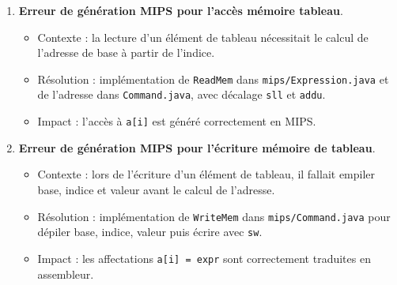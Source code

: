 \documentclass[a4paper,11pt]{article}
\begin{document}
\begin{enumerate}[label=\arabic*)]
  \item \textbf{Erreur de génération MIPS pour l'accès mémoire tableau}.
  \begin{itemize}
    \item Contexte : la lecture d'un élément de tableau nécessitait le calcul de l'adresse de base à partir de l'indice.
    \item Résolution : implémentation de \texttt{ReadMem} dans \texttt{mips/Expression.java} et de l'adresse dans \texttt{Command.java}, avec décalage \texttt{sll} et \texttt{addu}.
    \item Impact : l'accès à \texttt{a[i]} est généré correctement en MIPS.
  \end{itemize}

  \item \textbf{Erreur de génération MIPS pour l'écriture mémoire de tableau}.
  \begin{itemize}
    \item Contexte : lors de l'écriture d'un élément de tableau, il fallait empiler base, indice et valeur avant le calcul de l'adresse.
    \item Résolution : implémentation de \texttt{WriteMem} dans \texttt{mips/Command.java} pour dépiler base, indice, valeur puis écrire avec \texttt{sw}.
    \item Impact : les affectations \texttt{a[i] = expr} sont correctement traduites en assembleur.
  \end{itemize}
\end{enumerate}
\end{document}
